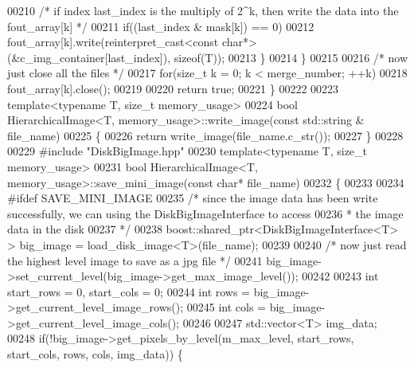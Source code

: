 \begin{DoxyCode}
00210                         \textcolor{comment}{/* if index last\_index is the multiply of 2^k, then
       write the data into the fout\_array[k] */}
00211                         \textcolor{keywordflow}{if}((last\_index & mask[k]) == 0)
00212                                 fout\_array[k].write(reinterpret\_cast<const
       char*>(&c\_img\_container[last\_index]), \textcolor{keyword}{sizeof}(T));
00213                 \}
00214         \}
00215 
00216         \textcolor{comment}{/* now just close all the files */}
00217         \textcolor{keywordflow}{for}(\textcolor{keywordtype}{size\_t} k = 0; k < merge\_number; ++k)
00218                 fout\_array[k].close();
00219 
00220         \textcolor{keywordflow}{return} \textcolor{keyword}{true};
00221 \}
00222 
00223 \textcolor{keyword}{template}<\textcolor{keyword}{typename} T, \textcolor{keywordtype}{size\_t} memory\_usage>
00224 \textcolor{keywordtype}{bool} HierarchicalImage<T, memory_usage>::write_image(\textcolor{keyword}{const} std::string &
      file\_name)
00225 \{
00226         \textcolor{keywordflow}{return} write\_image(file\_name.c\_str());
00227 \}
00228 
00229 \textcolor{preprocessor}{#include "DiskBigImage.hpp"}
00230 \textcolor{keyword}{template}<\textcolor{keyword}{typename} T, \textcolor{keywordtype}{size\_t} memory\_usage>
00231 \textcolor{keywordtype}{bool} HierarchicalImage<T, memory_usage>::save_mini_image(\textcolor{keyword}{const} \textcolor{keywordtype}{char}* file\_name)
00232 \{
00233 
00234 \textcolor{preprocessor}{#ifdef SAVE\_MINI\_IMAGE}
00235 \textcolor{preprocessor}{}        \textcolor{comment}{/* since the image data has been write successfully, we can using the
       DiskBigImageInterface to access}
00236 \textcolor{comment}{         * the image data in the disk}
00237 \textcolor{comment}{         */}
00238         boost::shared\_ptr<DiskBigImageInterface<T> > big\_image = 
      load\_disk\_image<T>(file\_name);
00239 
00240         \textcolor{comment}{/* now just read the highest level image to save as a jpg file */}
00241         big\_image->set\_current\_level(big\_image->get\_max\_image\_level());
00242 
00243         \textcolor{keywordtype}{int} start\_rows = 0, start\_cols = 0;
00244         \textcolor{keywordtype}{int} rows = big\_image->get\_current\_level\_image\_rows();
00245         \textcolor{keywordtype}{int} cols = big\_image->get\_current\_level\_image\_cols();
00246 
00247         std::vector<T> img\_data;
00248         \textcolor{keywordflow}{if}(!big\_image->get\_pixels\_by\_level(m\_max\_level, start\_rows, start\_cols,
       rows, cols, img\_data)) \{

\end{DoxyCode}
